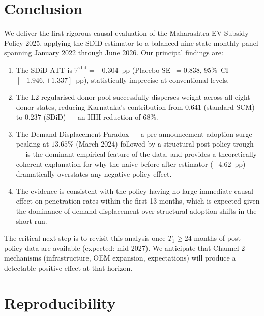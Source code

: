 \documentclass[journal]{IEEEtran}
\begin{document}
\section{Conclusion}
\label{sec:conclusion}

We deliver the first rigorous causal evaluation of the Maharashtra EV 
Subsidy Policy 2025, applying the SDiD estimator to a balanced 
nine-state monthly panel spanning January 2022 through June 2026. 
Our principal findings are:

\begin{enumerate}
  \item The SDiD ATT is $\hat{\tau}^{\mathrm{sdid}} = -0.304$~pp 
        (Placebo SE~$= 0.838$, 95\%~CI~$[-1.946, +1.337]$~pp), 
        statistically imprecise at conventional levels.
  
  \item The L2-regularised donor pool successfully disperses weight across 
        all eight donor states, reducing Karnataka's contribution from 
        $0.641$ (standard SCM) to $0.237$ (SDiD) — an HHI reduction of 
        68\%.
  
  \item The Demand Displacement Paradox — a pre-announcement adoption 
        surge peaking at $13.65\%$ (March 2024) followed by a 
        structural post-policy trough — is the dominant empirical feature 
        of the data, and provides a theoretically coherent explanation for 
        why the naive before-after estimator ($-4.62$~pp) dramatically 
        overstates any negative policy effect.
  
  \item The evidence is consistent with the policy having no large 
        immediate causal effect on penetration rates within the first 13 
        months, which is expected given the dominance of demand displacement 
        over structural adoption shifts in the short run.
\end{enumerate}

The critical next step is to revisit this analysis once $T_1 \geq 24$ 
months of post-policy data are available (expected: mid-2027). We 
anticipate that Channel 2 mechanisms (infrastructure, OEM expansion, 
expectations) will produce a detectable positive effect at that horizon.

\appendix
\section{Reproducibility}
\label{app:repro}
\end{document}

